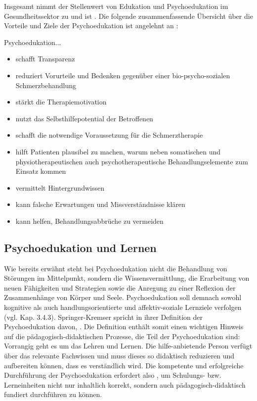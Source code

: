 \documentclass[
  twoside,
  parskip=half-,
]{scrreprt}
\begin{document}
Insgesamt nimmt der Stellenwert von Edukation und Psychoedukation im Gesundheitssektor zu und ist . Die folgende zusammenfassende Übersicht über die Vorteile und Ziele der Psychoedukation ist angelehnt an \textcite[7]{wachter}:

Psychoedukation...
\begin{itemize}[nosep, topsep=-10pt]
  \item schafft Transparenz
  \item reduziert Vorurteile und Bedenken gegenüber einer bio-psycho-sozialen Schmerzbehandlung
  \item stärkt die Therapiemotivation
  \item nutzt das Selbsthilfepotential der Betroffenen
  \item schafft die notwendige Voraussetzung für die Schmerztherapie
  \item hilft Patienten plausibel zu machen, warum neben somatischen und physiotherapeutischen auch psychotherapeutische Behandlungselemente zum Einsatz kommen
  \item vermittelt Hintergrundwissen
  \item kann falsche Erwartungen und Missverständnisse klären
  \item kann helfen, Behandlungsabbrüche zu vermeiden
\end{itemize}

\subsection{Psychoedukation und Lernen}
Wie bereits erwähnt steht bei Psychoedukation nicht die Behandlung von Störungen im Mittelpunkt, sondern die Wissensvermittlung, die Erarbeitung von neuen Fähigkeiten und Strategien sowie die Anregung zu einer Reflexion der Zusammenhänge von Körper und Seele. Psychoedukation soll demnach sowohl kognitive als auch handlungsorientierte und affektiv-soziale Lernziele verfolgen (vgl. Kap. 3.4.3). Springer-Kremser spricht in ihrer Definition der Psychoedukation davon, . Die Definition enthält somit einen wichtigen Hinweis auf die pädagogisch-didaktischen Prozesse, die Teil der Psychoedukation sind: Vorrangig geht es um das Lehren und Lernen. Die hilfe-anbietende Person verfügt über das relevante Fachwissen und muss dieses so didaktisch reduzieren und aufbereiten können, dass es verständlich wird. Die kompetente und erfolgreiche Durchführung der Psychoedukation erfordert also , um Schulungs- bzw. Lerneinheiten nicht nur inhaltlich korrekt, sondern auch pädagogisch-didaktisch fundiert durchführen zu können. 
\end{document}
